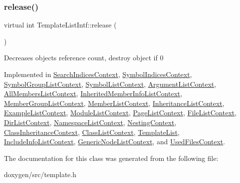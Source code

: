 \subsubsection{\texorpdfstring{release()}{release()}}
{\footnotesize\ttfamily virtual int Template\+List\+Intf\+::release (\begin{DoxyParamCaption}{ }\end{DoxyParamCaption})\hspace{0.3cm}{\ttfamily [pure virtual]}}

Decreases object\textquotesingle{}s reference count, destroy object if 0 

Implemented in \mbox{\hyperlink{class_search_indices_context_aaa6a25a82368e6d94c4c552687f2af7b}{Search\+Indices\+Context}}, \mbox{\hyperlink{class_symbol_indices_context_a9912083441aa4e5f250ecbbc088cf275}{Symbol\+Indices\+Context}}, \mbox{\hyperlink{class_symbol_group_list_context_a109a389eaead2b786cf4e7d607652e67}{Symbol\+Group\+List\+Context}}, \mbox{\hyperlink{class_symbol_list_context_ab793c4223391f4cf6c04c0e35af654f6}{Symbol\+List\+Context}}, \mbox{\hyperlink{class_argument_list_context_a7e22b3f45a889508dba94e578c8661f2}{Argument\+List\+Context}}, \mbox{\hyperlink{class_all_members_list_context_a7b3690135afdc30e9e6f3e2dbb9265cc}{All\+Members\+List\+Context}}, \mbox{\hyperlink{class_inherited_member_info_list_context_a7a5276e7ac2ff51f66d07715f333cbe7}{Inherited\+Member\+Info\+List\+Context}}, \mbox{\hyperlink{class_member_group_list_context_afc46c3c1646126f13c4357c4800a5fe0}{Member\+Group\+List\+Context}}, \mbox{\hyperlink{class_member_list_context_ada9f462753c6425d2912cd4cb02d4285}{Member\+List\+Context}}, \mbox{\hyperlink{class_inheritance_list_context_a1ab111b2d69cdf8920529f5674dba6d9}{Inheritance\+List\+Context}}, \mbox{\hyperlink{class_example_list_context_a16f04119a9b9f8d728637e149791d708}{Example\+List\+Context}}, \mbox{\hyperlink{class_module_list_context_a43785b9c64132a617e587d0181a5f4ae}{Module\+List\+Context}}, \mbox{\hyperlink{class_page_list_context_aec001e0a201e3d1c168a67c80ffc8f06}{Page\+List\+Context}}, \mbox{\hyperlink{class_file_list_context_a757f759e1158e2c2859cb86b483fcd51}{File\+List\+Context}}, \mbox{\hyperlink{class_dir_list_context_a138217a1757cf808ffa7eeb9fb051855}{Dir\+List\+Context}}, \mbox{\hyperlink{class_namespace_list_context_a8395f4caf4473517e10e0375efe0e419}{Namespace\+List\+Context}}, \mbox{\hyperlink{class_nesting_context_a4f43acface7c31d6bb2aa3d9a9f2ea13}{Nesting\+Context}}, \mbox{\hyperlink{class_class_inheritance_context_a4570bbdc5944d0c453971ec822106f9e}{Class\+Inheritance\+Context}}, \mbox{\hyperlink{class_class_list_context_a4e60c2feddfa7d51bdebf0e412266b91}{Class\+List\+Context}}, \mbox{\hyperlink{class_template_list_aeff3b4d0cf58bc2bd92de00c51cde488}{Template\+List}}, \mbox{\hyperlink{class_include_info_list_context_a8791d673ef9ceb58785f1bf729d53ed1}{Include\+Info\+List\+Context}}, \mbox{\hyperlink{class_generic_node_list_context_a0aa1daa5e593ca8326d05a9028759750}{Generic\+Node\+List\+Context}}, and \mbox{\hyperlink{class_used_files_context_ad179f197716bee4f11482390962cb180}{Used\+Files\+Context}}.



The documentation for this class was generated from the following file\+:\begin{DoxyCompactItemize}
\item 
doxygen/src/template.\+h\end{DoxyCompactItemize}
